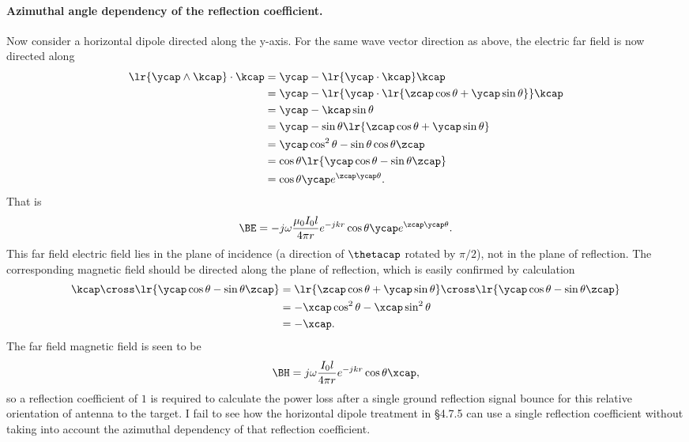 \paragraph{Azimuthal angle dependency of the reflection coefficient.}
%
Now consider a horizontal dipole directed along the y-axis.  For the same wave vector direction as above, the electric far field is now directed along
%
\begin{equation}\label{eqn:chapter4Notes:700}
\begin{aligned}
\lr{ \ycap \wedge \kcap } \cdot \kcap
&=
\ycap - \lr{ \ycap \cdot \kcap } \kcap
\\ &=
\ycap - \lr{ \ycap \cdot \lr{
\zcap \cos\theta + \ycap \sin\theta
} } \kcap
\\ &=
\ycap - \kcap \sin\theta
\\ &=
\ycap - \sin\theta \lr{
\zcap \cos\theta + \ycap \sin\theta
}
\\ &=
\ycap \cos^2 \theta - \sin\theta \cos\theta \zcap
\\ &= \cos\theta \lr{ \ycap \cos\theta - \sin\theta \zcap }
\\ &= \cos\theta \ycap e^{ \zcap \ycap \theta }.
\end{aligned}
\end{equation}
%
That is
%
\begin{equation}\label{eqn:chapter4Notes:720}
\BE =
-j \omega \frac{\mu_0 I_0 l}{4 \pi r} e^{-j k r}
\cos\theta \ycap e^{ \zcap \ycap \theta }.
\end{equation}
%
This far field electric field lies in the plane of incidence (a direction of \( \thetacap \) rotated by \( \pi/2 \)), not in the plane of reflection.  The corresponding magnetic field should be directed along the plane of reflection, which is easily confirmed by calculation
%
\begin{equation}\label{eqn:chapter4Notes:740}
\begin{aligned}
\kcap \cross
\lr{ \ycap \cos\theta - \sin\theta \zcap }
&=
\lr{ \zcap \cos\theta + \ycap \sin\theta } \cross
\lr{ \ycap \cos\theta - \sin\theta \zcap }
\\ &=
-\xcap \cos^2 \theta - \xcap \sin^2\theta
\\ &= -\xcap.
\end{aligned}
\end{equation}
%
The far field magnetic field is seen to be
%
\begin{equation}\label{eqn:chapter4Notes:721}
\BH =
j \omega \frac{I_0 l}{4 \pi r} e^{-j k r}
\cos\theta \xcap,
\end{equation}
%
so a reflection coefficient of \( 1 \) is required to calculate the power loss after a single ground reflection signal bounce for this relative orientation of antenna to the target.
%
I fail to see how the horizontal dipole treatment in \S 4.7.5 can use a single reflection coefficient without taking into account the azimuthal dependency of that reflection coefficient.

